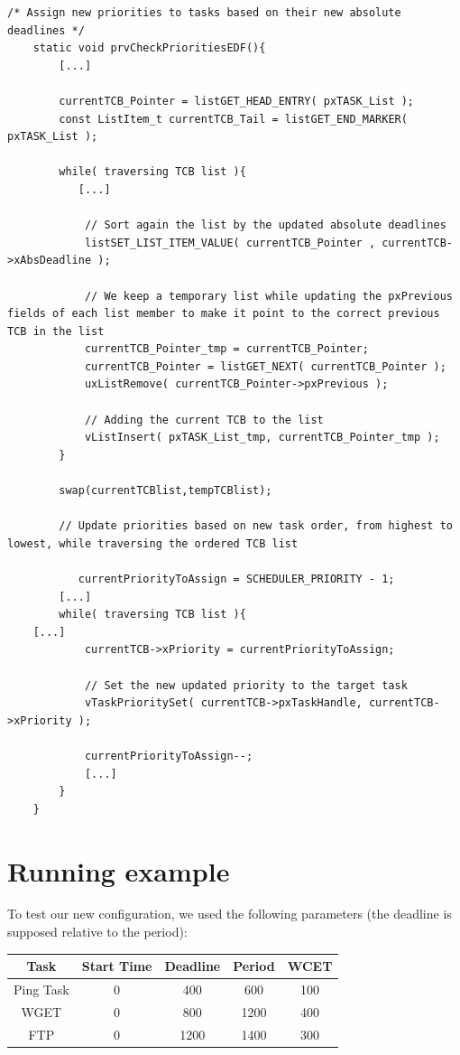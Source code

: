 \documentclass[10pt]{article}
\begin{document}
\begin{lstlisting}
/* Assign new priorities to tasks based on their new absolute deadlines */
    static void prvCheckPrioritiesEDF(){
        [...]

        currentTCB_Pointer = listGET_HEAD_ENTRY( pxTASK_List );
        const ListItem_t currentTCB_Tail = listGET_END_MARKER( pxTASK_List );
        
        while( traversing TCB list ){
           [...]

            // Sort again the list by the updated absolute deadlines
            listSET_LIST_ITEM_VALUE( currentTCB_Pointer , currentTCB->xAbsDeadline );

            // We keep a temporary list while updating the pxPrevious fields of each list member to make it point to the correct previous TCB in the list
            currentTCB_Pointer_tmp = currentTCB_Pointer;
            currentTCB_Pointer = listGET_NEXT( currentTCB_Pointer );
            uxListRemove( currentTCB_Pointer->pxPrevious );
            
			// Adding the current TCB to the list
            vListInsert( pxTASK_List_tmp, currentTCB_Pointer_tmp );
        }

        swap(currentTCBlist,tempTCBlist);
        
        // Update priorities based on new task order, from highest to lowest, while traversing the ordered TCB list
        
           currentPriorityToAssign = SCHEDULER_PRIORITY - 1;
       	[...]
        while( traversing TCB list ){
   	[...]
            currentTCB->xPriority = currentPriorityToAssign;
            
            // Set the new updated priority to the target task
            vTaskPrioritySet( currentTCB->pxTaskHandle, currentTCB->xPriority );
            
            currentPriorityToAssign--;
            [...]
        }
    }

\end{lstlisting}

\section{Running example}
To test our new configuration, we used the following parameters (the deadline is supposed relative to the period):
\begin{center}
\begin{tabular}{|c||c|c|c|c|}
\hline 
\rule[-1ex]{0pt}{2.5ex} Task & Start Time & Deadline & Period & WCET \\ 
\hline 
\rule[-1ex]{0pt}{2.5ex} Ping Task & 0 & 400 & 600 & 100 \\ 
\hline 
\rule[-1ex]{0pt}{2.5ex} WGET &  0 & 800 & 1200 & 400 \\ 
\hline 
\rule[-1ex]{0pt}{2.5ex} FTP & 0 & 1200 & 1400 & 300 \\ 
\hline 
\end{tabular}
\end{center}
\end{document}
